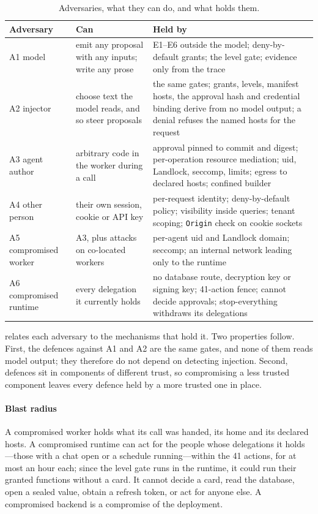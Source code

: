 \documentclass[10pt,twocolumn,a4paper]{article}
\newcommand{\code}[1]{\texttt{\small #1}}
\begin{document}
\begin{table}[t]
\centering\small
\caption{Adversaries, what they can do, and what holds them.}
\label{tab:matrix}
\begin{tabularx}{\textwidth}{@{}>{\raggedright\arraybackslash}p{}>{\raggedright\arraybackslash}p{}>{\raggedright\arraybackslash}X@{}}
\toprule
\textbf{Adversary} & \textbf{Can} & \textbf{Held by} \\
\midrule
A1 model & emit any proposal with any inputs; write any prose & E1--E6 outside the model; deny-by-default grants; the level gate; evidence only from the trace \\
A2 injector & choose text the model reads, and so steer proposals & the same gates; grants, levels, manifest hosts, the approval hash and credential binding derive from no model output; a denial refuses the named hosts for the request \\
A3 agent author & arbitrary code in the worker during a call & approval pinned to commit and digest; per-operation resource mediation; uid, Landlock, seccomp, limits; egress to declared hosts; confined builder \\
A4 other person & their own session, cookie or API key & per-request identity; deny-by-default policy; visibility inside queries; tenant scoping; \code{Origin} check on cookie sockets \\
A5 compromised worker & A3, plus attacks on co-located workers & per-agent uid and Landlock domain; seccomp; an internal network leading only to the runtime \\
A6 compromised runtime & every delegation it currently holds & no database route, decryption key or signing key; 41-action fence; cannot decide approvals; stop-everything withdraws its delegations \\
\bottomrule
\end{tabularx}
\end{table}

 relates each adversary to the mechanisms that hold
it. Two properties follow. First, the defences against A1 and A2 are
the same gates, and none of them reads model output; they therefore do
not depend on detecting injection. Second, defences sit in components
of different trust, so compromising a less trusted component leaves
every defence held by a more trusted one in place.

\paragraph{Blast radius}
A compromised worker holds what its call was handed, its home and its
declared hosts. A compromised runtime can act for the people whose
delegations it holds---those with a chat open or a schedule
running---within the 41 actions, for at most an hour each; since the
level gate runs in the runtime, it could run their granted functions
without a card. It cannot decide a card, read the database, open a
sealed value, obtain a refresh token, or act for anyone else. A
compromised backend is a compromise of the deployment.
\end{document}
